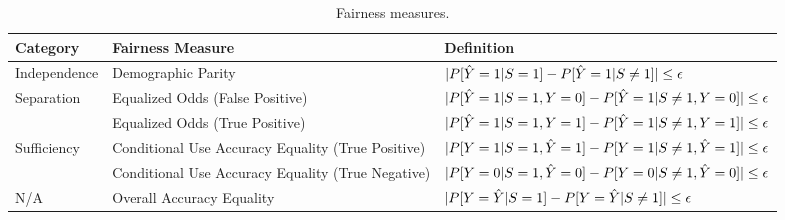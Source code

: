 \documentclass[manuscript,screen,review,anonymous]{acmart}
\DeclarePairedDelimiter{\abs}{\lvert}{\rvert}
\begin{document}
\begin{table}[h]
\caption{Fairness measures.}
\label{tab:measures}
\begin{tabular}{lll}
\toprule
\textbf{Category} & \textbf{Fairness Measure} & \textbf{Definition} \\
\midrule
\multirow{1}{*}{Independence}
& Demographic Parity & $\abs{P[\hat{Y} = 1 | S = 1] - P[\hat{Y} = 1 | S \neq 1]} \leq \epsilon$ \\
\multirow{2}{*}{Separation}
& \multirow{1}{*}{Equalized Odds (False Positive)} & $\abs{P[\hat{Y} = 1 | S = 1, Y = 0] - P[\hat{Y} = 1 | S \neq 1, Y = 0]} \leq \epsilon$ \\
& \multirow{1}{*}{Equalized Odds (True Positive)} & $\abs{P[\hat{Y} = 1 | S = 1, Y = 1] - P[\hat{Y} = 1 | S \neq 1, Y = 1]} \leq \epsilon$ \\
\multirow{2}{*}{Sufficiency}
& \multirow{1}{*}{Conditional Use Accuracy Equality (True Positive)} & $\abs{P[Y = 1 | S = 1, \hat{Y} = 1] - P[Y = 1 | S \neq 1, \hat{Y} = 1]} \leq \epsilon$ \\
& \multirow{1}{*}{Conditional Use Accuracy Equality (True Negative)} & $\abs{P[Y = 0 | S = 1, \hat{Y} = 0] - P[Y = 0 | S \neq 1, \hat{Y} = 0]} \leq \epsilon$ \\
\multirow{1}{*}{N/A}
& Overall Accuracy Equality & $\abs{P[Y = \hat{Y} | S = 1] - P[Y = \hat{Y} | S \neq 1]} \leq \epsilon$ \\
\bottomrule
\end{tabular}
\end{table}
\end{document}
